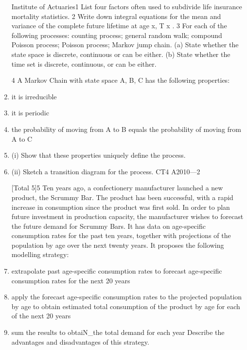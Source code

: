 \documentclass[a4paper,12pt]{article}
\begin{document}
\begin{enumerate}
 Institute of Actuaries1 List four factors often used to subdivide life insurance mortality statistics.  
2 Write down integral equations for the mean and variance of the complete future
lifetime at age x, T x .  
3
For each of the following processes:
counting process;
general random walk;
compound Poisson process;
Poisson process;
Markov jump chain.
(a) State whether the state space is discrete, continuous or can be either.
(b) State whether the time set is discrete, continuous, or can be either.
 
4
A Markov Chain with state space {A, B, C} has the following properties:
\item it is irreducible
\item it is periodic
\item the probability of moving from A to B equals the probability of moving from A
to C
\item (i) Show that these properties uniquely define the process.
\item (ii) Sketch a transition diagram for the process.
CT4 A2010—2

 
[Total 5]5
Ten years ago, a confectionery manufacturer launched a new product, the Scrummy
Bar. The product has been successful, with a rapid increase in consumption since the
product was first sold. In order to plan future investment in production capacity, the
manufacturer wishes to forecast the future demand for Scrummy Bars. It has data on
age-specific consumption rates for the past ten years, together with projections of the
population by age over the next twenty years. It proposes the following modelling
strategy:
\item extrapolate past age-specific consumption rates to forecast age-specific
consumption rates for the next 20 years
\item apply the forecast age-specific consumption rates to the projected population by
age to obtain estimated total consumption of the product by age for each of the
next 20 years
\item sum the results to obtaiN_the total demand for each year
Describe the advantages and disadvantages of this strategy.

\newpage


\end{enumerate}
\end{document}
